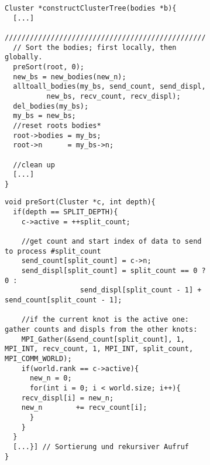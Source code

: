 \begin{figure}[b]
  \begin{subfigure}{0.9\textwidth}
    \begin{lstlisting}[label=lst:parconsttree, caption={Ausschnitt aus der parallelen Konstruktion des Clusterbaumes.}]
Cluster *constructClusterTree(bodies *b){
  [...]
  ////////////////////////////////////////////////////////
  // Sort the bodies; first locally, then globally.
  preSort(root, 0);
  new_bs = new_bodies(new_n);
  alltoall_bodies(my_bs, send_count, send_displ, 
		  new_bs, recv_count, recv_displ);
  del_bodies(my_bs);
  my_bs = new_bs;
  //reset roots bodies*
  root->bodies = my_bs;
  root->n      = my_bs->n;
  
  //clean up
  [...]
}
    \end{lstlisting}
  \end{subfigure}
\end{figure}

\begin{figure}[t]
  \begin{subfigure}{0.9\textwidth}
    \begin{lstlisting}[label=lst:presort, caption={Diese Methode sortiert die lokalen \code{bodies} nach Prozesszugehörigkeit.}]
void preSort(Cluster *c, int depth){
  if(depth == SPLIT_DEPTH){
    c->active = ++split_count;
    
    //get count and start index of data to send to process #split_count
    send_count[split_count] = c->n;
    send_displ[split_count] = split_count == 0 ? 0 : 
			      send_displ[split_count - 1] + send_count[split_count - 1];
    
    //if the current knot is the active one: gather counts and displs from the other knots:
    MPI_Gather(&send_count[split_count], 1, MPI_INT, recv_count, 1, MPI_INT, split_count, MPI_COMM_WORLD);
    if(world.rank == c->active){
      new_n = 0;
      for(int i = 0; i < world.size; i++){
	recv_displ[i] = new_n;
	new_n        += recv_count[i];
      }
    }
  } 
  [...}] // Sortierung und rekursiver Aufruf
}
    \end{lstlisting}
  \end{subfigure}
\end{figure}
